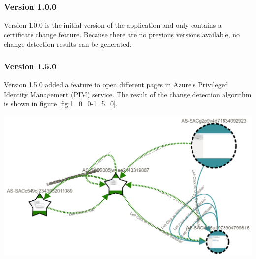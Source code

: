 \subsubsection{Version 1.0.0}
Version 1.0.0 is the initial version of the application and only contains a certificate change feature. Because there are no previous versions available, no change detection results can be generated.

\subsubsection{Version 1.5.0}
Version 1.5.0 added a feature to open different pages in Azure's Privileged Identity Management (PIM) service. The result of the change detection algorithm is shown in figure \ref{fig:1_0_0-1_5_0}. 

\begingroup
\captionsetup{type=figure}
\includegraphics[scale=0.4]{images/6-Experiment/1_0_0-1_5_0.png}
\label{fig:1_0_0-1_5_0}
\endgroup

